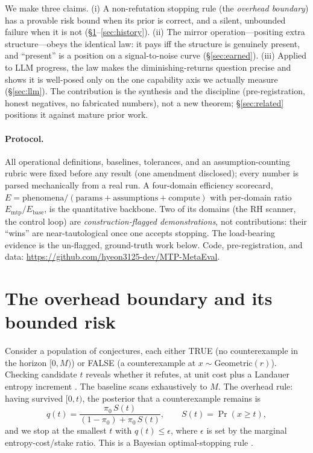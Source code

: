 \documentclass[11pt]{article}
\begin{document}
We make three claims. (i) A non-refutation stopping rule (the \emph{overhead
boundary}) has a provable risk bound when its prior is correct, and a silent,
unbounded failure when it is not (\S\ref{sec:bound}--\ref{sec:history}). (ii) The
mirror operation---positing extra structure---obeys the identical law: it pays iff
the structure is genuinely present, and ``present'' is a position on a
signal-to-noise curve (\S\ref{sec:earned}). (iii) Applied to LLM progress, the law
makes the diminishing-returns question precise and shows it is well-posed only on
the one capability axis we actually measure (\S\ref{sec:llm}). The contribution is
the synthesis and the discipline (pre-registration, honest negatives, no
fabricated numbers), not a new theorem; \S\ref{sec:related} positions it against
mature prior work.

\paragraph{Protocol.} All operational definitions, baselines, tolerances, and an
assumption-counting rubric were fixed before any result (one amendment disclosed);
every number is parsed mechanically from a real run. A four-domain efficiency
scorecard, $E=\mathrm{phenomena}/(\mathrm{params}+\mathrm{assumptions}+
\mathrm{compute})$ with per-domain ratio $E_{\mathrm{mtp}}/E_{\mathrm{base}}$,
is the quantitative backbone. Two of its domains (the RH scanner, the control
loop) are \emph{construction-flagged demonstrations}, not contributions: their
``wins'' are near-tautological once one accepts stopping. The load-bearing
evidence is the un-flagged, ground-truth work below. Code, pre-registration, and
data: \url{https://github.com/hyeon3125-dev/MTP-MetaEval}.

\section{The overhead boundary and its bounded risk}\label{sec:bound}
Consider a population of conjectures, each either TRUE (no counterexample in the
horizon $[0,M)$) or FALSE (a counterexample at $x\sim\mathrm{Geometric}(r)$).
Checking candidate $t$ reveals whether it refutes, at unit cost plus a Landauer
entropy increment \citep{landauer1961}. The baseline scans exhaustively to $M$.
The overhead rule: having survived $[0,t)$, the posterior that a counterexample
remains is
\begin{equation}
q(t)=\frac{\pi_0\,S(t)}{(1-\pi_0)+\pi_0\,S(t)},\qquad S(t)=\Pr(x\ge t),
\end{equation}
and we stop at the smallest $t$ with $q(t)\le\epsilon$, where $\epsilon$ is set by
the marginal entropy-cost/stake ratio. This is a Bayesian optimal-stopping rule
\citep{wald1945,chow1971}.
\end{document}
